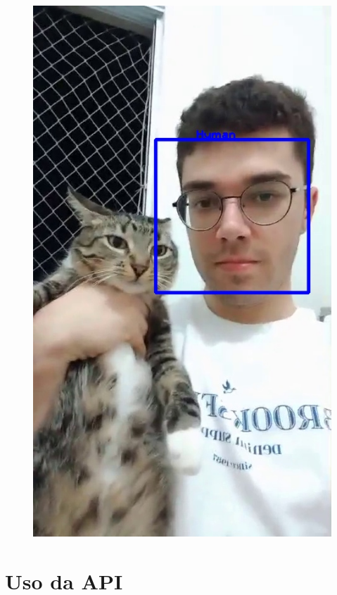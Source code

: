\documentclass[12pt, %
openright, 
oneside, %
a4paper,    %
brazil]{facom-ufu-abntex2}
\begin{document}
\begin{apendicesenv}
\begin{figure}[ht]
\begin{minipage}{0.48\textwidth}
			\label{fig:tina}
		\end{minipage}\hfill
		\begin{minipage}{0.48\textwidth}
			\centering
			\includegraphics[scale=0.35]{./figuras/rec2.jpeg}
			\label{fig:me}
		\end{minipage}
	\end{figure}

	\section{Uso da API}


\end{apendicesenv}
\end{document}
